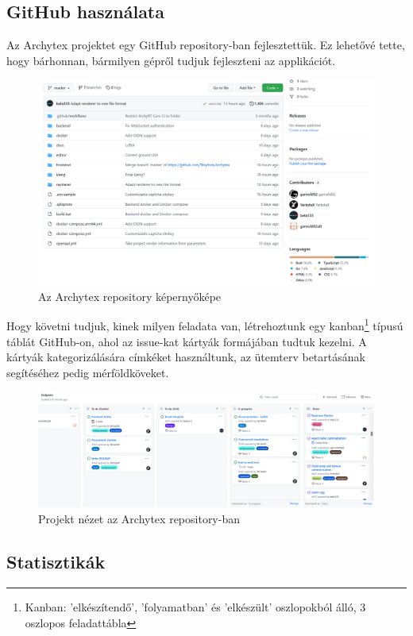\subsection{GitHub használata}
Az Archytex projektet egy GitHub repository-ban fejlesztettük. Ez lehetővé tette, hogy bárhonnan, bármilyen gépről tudjuk fejleszteni az applikációt.

\begin{figure}[H]
  \centering
  \includegraphics[width=.9\textwidth]{parts/developer-documentation/work/images/repository.png}
  \caption{Az Archytex repository képernyőképe}
\end{figure}

Hogy követni tudjuk, kinek milyen feladata van, létrehoztunk egy kanban\footnote{Kanban: 'elkészítendő', 'folyamatban' és 'elkészült' oszlopokból álló, 3 oszlopos feladattábla} típusú táblát GitHub-on, ahol az issue-kat kártyák formájában tudtuk kezelni. A kártyák kategorizálására címkéket használtunk, az ütemterv betartásának segítéséhez pedig mérföldköveket.

\begin{figure}[H]
  \centering
  \includegraphics[width=.9\textwidth]{parts/developer-documentation/work/images/github-project.png}
  \caption{Projekt nézet az Archytex repository-ban}
\end{figure}

\subsection{Statisztikák}

